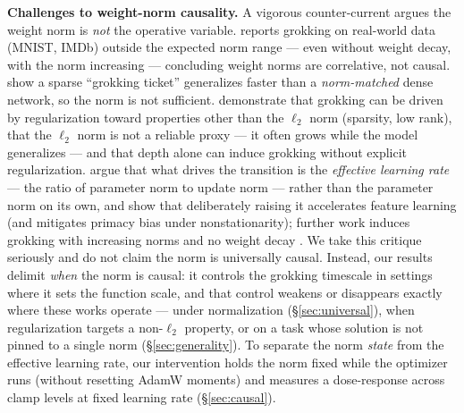 \documentclass[10pt,twocolumn]{article}
\begin{document}
\textbf{Challenges to weight-norm causality.}
A vigorous counter-current argues the weight norm is \emph{not} the operative variable.
\citet{golechha2024progress} reports grokking on real-world data (MNIST, IMDb) outside the expected norm
range --- even without weight decay, with the norm increasing --- concluding weight norms are correlative,
not causal. \citet{minegishi2023grokking} show a sparse ``grokking ticket'' generalizes faster than a
\emph{norm-matched} dense network, so the norm is not sufficient. \citet{notsawo2025euclidean} demonstrate
that grokking can be driven by regularization toward properties other than the $\ell_2$ norm (sparsity,
low rank), that the $\ell_2$ norm is not a reliable proxy --- it often grows while the model generalizes ---
and that depth alone can induce grokking without explicit regularization. \citet{nonstationarity2025}
argue that what drives the transition is the \emph{effective learning rate} --- the ratio of parameter norm
to update norm --- rather than the parameter norm on its own, and show that deliberately raising it
accelerates feature learning (and mitigates primacy bias under nonstationarity); further work induces
grokking with increasing norms and no weight decay \citep{datafallsshort2025}. We take this critique seriously and do not claim the norm is universally
causal. Instead, our results delimit \emph{when} the norm is causal: it controls the grokking timescale in
settings where it sets the function scale, and that control weakens or disappears exactly where these works
operate --- under normalization (\S\ref{sec:universal}), when regularization targets a non-$\ell_2$ property,
or on a task whose solution is not pinned to a single norm (\S\ref{sec:generality}). To separate the norm
\emph{state} from the effective learning rate, our intervention holds the norm fixed while the optimizer runs (without
resetting AdamW moments) and measures a dose-response across clamp levels at fixed learning rate
(\S\ref{sec:causal}).
\end{document}
